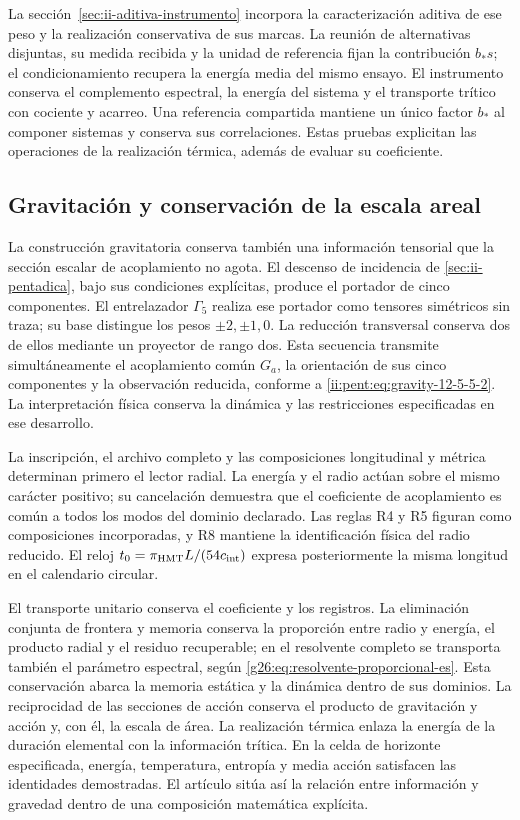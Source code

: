 La sección~\ref{sec:ii-aditiva-instrumento} incorpora la caracterización
aditiva de ese peso y la realización conservativa de sus marcas.
La reunión de alternativas disjuntas, su medida recibida y la unidad de
referencia fijan la contribución $b_*s$; el condicionamiento recupera
la energía media del mismo ensayo. El instrumento conserva el complemento
espectral, la energía del sistema y el transporte trítico con cociente y acarreo.
Una referencia compartida mantiene un único factor $b_*$ al componer
sistemas y conserva sus correlaciones. Estas pruebas explicitan las
operaciones de la realización térmica, además de evaluar su coeficiente.

\subsection{Gravitación y conservación de la escala areal}

La construcción gravitatoria conserva también una información tensorial
que la sección escalar de acoplamiento no agota. El descenso de incidencia
de \ref{sec:ii-pentadica}, bajo sus condiciones explícitas, produce el
portador de cinco componentes. El entrelazador \(\Gamma_5\) realiza ese
portador como tensores simétricos sin traza; su base distingue los pesos
\(\pm2,\pm1,0\). La reducción transversal conserva dos de ellos mediante
un proyector de rango dos. Esta secuencia transmite simultáneamente el
acoplamiento común \(G_a\), la orientación de sus cinco componentes y
la observación reducida, conforme a
\eqref{ii:pent:eq:gravity-12-5-5-2}. La interpretación física conserva la
dinámica y las restricciones especificadas en ese desarrollo.

La inscripción, el archivo completo y las composiciones longitudinal
y métrica determinan primero el lector radial. La energía y el radio
actúan sobre el mismo carácter positivo; su cancelación demuestra que
el coeficiente de acoplamiento es común a todos los modos del dominio
declarado. Las reglas R4 y R5 figuran como composiciones incorporadas,
y R8 mantiene la identificación física del radio reducido. El reloj
\(t_0=\pi_{\mathrm{HMT}}L/(54c_{\rm int})\) expresa posteriormente la
misma longitud en el calendario circular.

El transporte unitario conserva el coeficiente y los registros. La
eliminación conjunta de frontera y memoria conserva la proporción
entre radio y energía, el producto radial y el residuo recuperable;
en el resolvente completo se transporta también el parámetro espectral,
según \eqref{g26:eq:resolvente-proporcional-es}. Esta conservación
abarca la memoria estática y la dinámica dentro de sus dominios.
La reciprocidad de las secciones de acción conserva el
producto de gravitación y acción y, con él, la escala de área. La
realización térmica enlaza la energía de la duración elemental con la
información trítica. En la celda de horizonte especificada, energía,
temperatura, entropía y media acción satisfacen las identidades
demostradas. El artículo sitúa así la relación entre información y
gravedad dentro de una composición matemática explícita.

